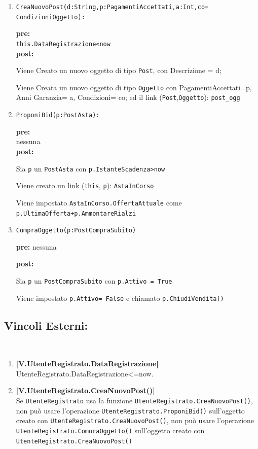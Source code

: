 \documentclass{article}
\begin{document}
\begin{enumerate}
    \item \texttt{CreaNuovoPost(d:String,p:PagamentiAccettati,a:Int,co= CondizioniOggetto):}
    
    \textbf{pre:}\\ \texttt{this.DataRegistrazione<now} \\
    
    \textbf{post:} 
    
    Viene Creato un nuovo oggetto di tipo \texttt{Post}, con Descrizione = d;
    
    Viene Creata un nuovo oggetto di tipo \texttt{Oggetto} con PagamentiAccettati=p, Anni Garanzia= a, Condizioni= co; ed il link (\texttt{Post},\texttt{Oggetto}): \texttt{post\_ogg}
    
    \item \texttt{ProponiBid(p:PostAsta):}
    
    \textbf{pre:}\\ nessuna\\
    
    \textbf{post:}
    
    Sia \texttt{p} un \texttt{PostAsta} con \texttt{p.IstanteScadenza>now}
    
    Viene creato un link (\texttt{this}, \texttt{p}): \texttt{AstaInCorso}
    
    Viene impostato \texttt{AstaInCorso.OffertaAttuale} come \texttt{p.UltimaOfferta+p.AmmontareRialzi}
    
    \item \texttt{CompraOggetto(p:PostCompraSubito)}
    
    \textbf{pre:} nessuna
    
    \textbf{post:}
    
    Sia \texttt{p} un \texttt{PostCompraSubito} con \texttt{p.Attivo = True}
    
    Viene impostato \texttt{p.Attivo= False} e chiamato \texttt{p.ChiudiVendita()}
\end{enumerate}

\subsection{Vincoli Esterni:}\\
\begin{enumerate}
    \item \textbf{[V.UtenteRegistrato.DataRegistrazione]}\\
    {UtenteRegistrato.DataRegistrazione<=now.}
    \item \textbf{[V.UtenteRegistrato.CreaNuovoPost()]}\\
    Se \texttt{UtenteRegistrato} usa la funzione \texttt{UtenteRegistrato.CreaNuovoPost()}, non può usare l'operazione \texttt{UtenteRegistrato.ProponiBid()} sull'oggetto creato con \texttt{UtenteRegistrato.CreaNuovoPost()}, non può usare l'operazione \texttt{UtenteRegistrato.ComoraOggetto()} sull'oggetto creato con \texttt{UtenteRegistrato.CreaNuovoPost()}
\end{enumerate}
\end{document}
